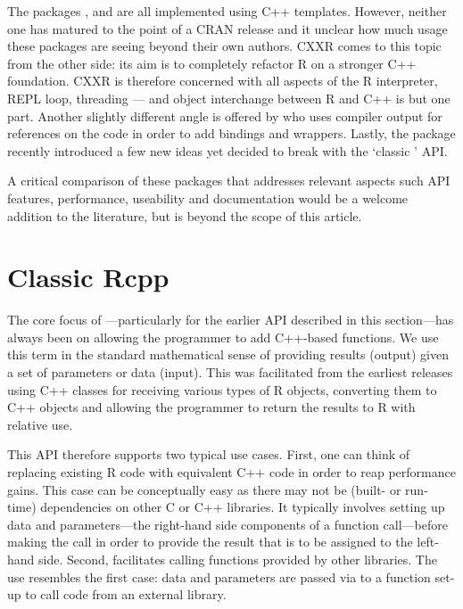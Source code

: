 The packages  \citep{liang08:rcppbind}, 
\citep{armstrong09:RAbstraction} and 
\citep{armstrong09:RObjects} are all implemented using C++ templates.
However, neither one has matured to the point of a CRAN release and it
unclear how much usage these packages are seeing beyond their own authors.
%
CXXR \citep{runnalls09:cxxr} comes to this topic from the other side: 
its aim is to completely refactor R on a stronger C++ foundation. 
CXXR is therefore concerned with all aspects of the R interpreter,
REPL loop, threading --- and object interchange between R and C++ is but one part.
%
Another slightly different angle is offered by
\cite{templelang09:rgcctranslationunit} who uses compiler output for
references on the code in order to add bindings and wrappers.
%
Lastly, the  package \citep{samperi09:rcpptemplate}
recently introduced a few new ideas yet decided to break with the
`classic ' API.

A critical comparison of these packages that addresses relevant aspects such
API features, performance, useability and documentation would be a welcome
addition to the literature, but is beyond the scope of this article.

\section{Classic Rcpp}
\label{sec:classic_rcpp}

The core focus of ---particularly for the earlier API described in
this section---has always been on allowing the programmer to add C++-based
functions. We use this term in the standard mathematical sense of providing
results (output) given a set of parameters or data (input). This was
facilitated from the earliest releases using C++ classes for receiving
various types of R objects, converting them to C++ objects and allowing the
programmer to return the results to R with relative use. 

This API therefore supports two typical use cases. First, one can think of
replacing existing R code with equivalent C++ code in order to reap
performance gains.  This case can be conceptually easy as there may not be
(built- or run-time) dependencies on other C or C++ libraries.  It typically
involves setting up data and parameters---the right-hand side components of a
function call---before making the call in order to provide the result that is
to be assigned to the left-hand side. Second,  facilitates calling
functions provided by other libraries. The use resembles the first case: data
and parameters are passed via  to a function set-up to call code
from an external library.  


